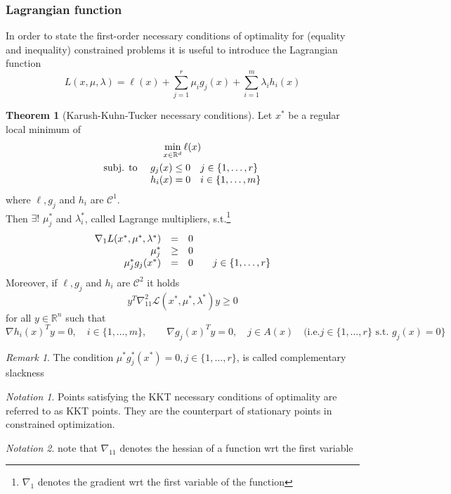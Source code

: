 \documentclass{book}
\newcommand{\R}{\mathbb{R}}
\theoremstyle{definition}
\newtheorem{theorem}{Theorem}[section]
\theoremstyle{remark}
\newtheorem*{remark}{Remark}
\theoremstyle{remark}
\newtheorem*{notation}{Notation}
\begin{document}
\subsubsection{Lagrangian function}
In order to state the first-order necessary conditions of optimality for (equality and inequality) constrained problems it is useful to introduce the Lagrangian function 
\[
    L(x,\mu,\lambda)=\ell(x)+\displaystyle\sum_{j=1}^{r}\mu_ig_j(x) + \displaystyle\sum_{i=1}^{m}\lambda_i h_i(x)
\]
\begin{theorem}[Karush-Kuhn-Tucker necessary conditions]
    Let $x^*$ be a regular local minimum of 
    \begin{gather*}
        \min_{x\in\R^d} \ell(x) \\
        \begin{array}{l l}
            \text{subj. to } & g_j(x)\leq 0 \quad j\in\{1,\dots,r\}\\
                             & h_i(x)=0 \quad i\in\{1,\dots,m\}
        \end{array}
    \end{gather*}
    where $\ell,g_j$ and $h_i$ are $\mathcal{C}^1$. \\
    Then $\exists!$  $\mu_j^*$ and $\lambda_i^*$, called Lagrange multipliers, s.t.\footnote{ $\nabla_1$ denotes the gradient wrt the first variable of the function}
    \[
        \begin{array}{ r c l}
            \nabla_1L(x^*,\mu^*,\lambda^*) & = & 0 \\             \mu_j^* & \geq & 0 \\
            \mu^*_jg_j(x^*) & = & 0 \qquad j\in \{1,\dots,r\} 
        \end{array}
    \]
    Moreover, if $\ell, g_j$ and $h_i$ are $\mathcal{C}^2$ it holds
    \[
        y^T\nabla_{11}^2\mathcal{L}(x^*,\mu^*,\lambda^*)y \geq 0
    \]
    for all $y\in\R^n$ such that
    \[
    \nabla h_i(x)^Ty = 0, \quad i\in\{1,\dots,m\}, \qquad \nabla g_j(x)^Ty = 0, \quad j\in A(x) \quad \text{(i.e.} j\in\{1,\dots,r\} \text{ s.t. } g_j(x)=0\}
\]
\end{theorem}
\begin{remark}
    The condition $\mu^*g_j^*(x^*)=0,j\in\{1,\dots,r\}$, is called complementary slackness
\end{remark}
\begin{notation}
    Points satisfying the KKT necessary conditions of optimality are referred to as KKT points. They are the counterpart of stationary points in constrained optimization.
\end{notation}
\begin{notation}
    note that $\nabla_{11}$ denotes the hessian of a function wrt the first variable
\end{notation}
\end{document}
